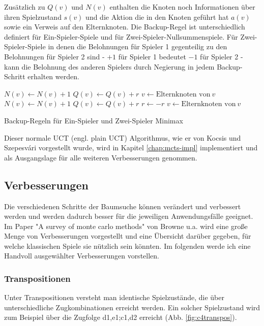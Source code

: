 Zusätzlich zu $Q(v)$ und $N(v)$ enthalten die Knoten noch Informationen über ihren Spielzustand $s(v)$ und die Aktion die in den Knoten geführt hat $a(v)$ sowie ein Verweis auf den Elternknoten. Die Backup-Regel ist unterschiedlich definiert für Ein-Spieler-Spiele und für Zwei-Spieler-Nullsummenspiele. Für Zwei-Spieler-Spiele in denen die Belohnungen für Spieler 1 gegenteilig zu den Belohnungen für Spieler 2 sind - $+1$ für Spieler 1 bedeutet $-1$ für Spieler 2 - kann die Belohnung des anderen Spielers durch Negierung in jedem Backup-Schritt erhalten werden.


\begin{algorithm}[H]
\begin{algorithmic}		
 
		\State $N(v) \gets N(v) + 1$
		\State $Q(v) \gets Q(v) + r$
		\State $v \gets \text{Elternknoten von}\ v$
	\EndWhile
\EndFunction\\

 
		\State $N(v) \gets N(v) + 1$
		\State $Q(v) \gets Q(v) + r$
		\State $r \gets -r$
		\State $v \gets \text{Elternknoten von}\ v$
	\EndWhile
\EndFunction
\end{algorithmic}
\caption{Backup-Regeln für Ein-Spieler und Zwei-Spieler Minimax}
\end{algorithm}

Dieser normale UCT (engl. plain UCT) Algorithmus, wie er von Kocsis und Szepesv\'{a}ri vorgestellt wurde, wird in Kapitel \ref{chap:mcts-impl} implementiert und als Ausgangslage für alle weiteren Verbesserungen genommen. 

\subsection{Verbesserungen}

Die verschiedenen Schritte der Baumsuche können verändert und verbessert werden und werden dadurch besser für die jeweiligen Anwendungsfälle geeignet. Im Paper "A survey of monte carlo methods" von Browne u.a.\autocite{browneSurveyMonteCarlo2012} wird eine große Menge von Verbesserungen vorgestellt und eine Übersicht darüber gegeben, für welche klassischen Spiele sie nützlich sein könnten. Im folgenden werde ich eine Handvoll ausgewählter Verbesserungen vorstellen.

\subsubsection{Transpositionen}
\label{transpos}
Unter Transpositionen versteht man identische Spielzustände, die über unterschiedliche Zugkombinationen erreicht werden. Ein solcher Spielzustand wird zum Beispiel über die Zugfolge d1,e1;c1,d2 erreicht (Abb. \ref{fig:c4transpos}).

